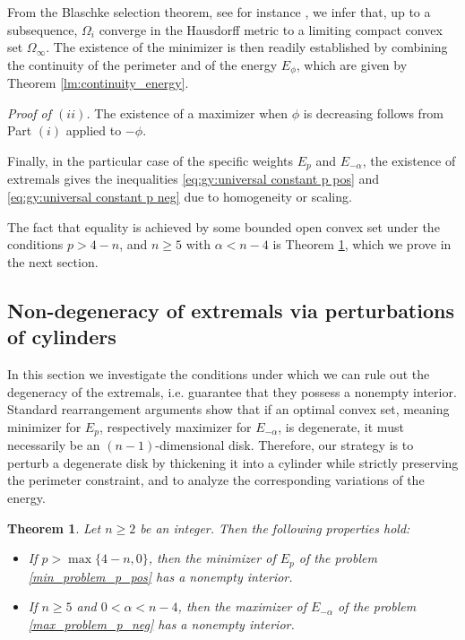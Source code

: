 \documentclass[10pt,leqno]{amsart}
\makeatletter
\newtheorem{Theorem}{Theorem}
\numberwithin{Theorem}{section}
\theoremstyle{definition}
\theoremstyle{remark}
\numberwithin{equation}{section}
\numberwithin{equation}{section}
\newenvironment{customproof}[1]{%
  \par\pushQED{\qed}%
  \normalfont\topsep6pt \trivlist
  \item[\hskip\labelsep\itshape
    Proof of #1\@addpunct{.}]\ignorespaces
}{%
  \popQED\endtrivlist\@endpefalse
}
\makeatother
\begin{document}
\begin{customproof}{Theorem \ref{Thm:intro:existence1}}
From the Blaschke selection theorem, see for instance \cite[Theorem 1.8.7]{Schneider}, we infer that, up to a subsequence, $\Omega_i$ converge in the Hausdorff metric to a limiting compact convex set $\Omega_\infty$. The existence of the minimizer is then readily established by combining the continuity of the perimeter and of the energy $E_\phi$, which are given by Theorem \ref{lm:continuity_energy}.

\smallskip
\textit{Proof of $(ii)$.} The existence of a maximizer when $\phi$ is decreasing follows  from Part $(i)$ applied to $-\phi$.


\smallskip
Finally, in the particular case of the specific weights $E_{p}$ and $E_{-\alpha}$, the existence of extremals gives the inequalities \eqref{eq:gy:universal constant p pos} and \eqref{eq:gy:universal constant p neg} due to homogeneity or scaling.

The fact that equality is achieved by some bounded open convex set under the  conditions $p> 4-n$, and $n \ge 5$ with $\alpha < n-4$ is Theorem \ref{thm:nonempty_interior}, which we prove in the next section. 
\end{customproof}


\subsection{Non-degeneracy of extremals via perturbations of cylinders}
\label{Sec:non_degeneracy}



In this section we investigate the conditions under which we can rule out the degeneracy of the extremals, i.e. guarantee that they possess a nonempty interior. Standard rearrangement arguments show that if an optimal convex set, meaning minimizer for $E_p$, respectively maximizer for $E_{-\alpha}$, is degenerate, it must necessarily  be an $(n-1)$-dimensional disk. Therefore, our strategy is to perturb a degenerate disk by thickening it into a cylinder while strictly preserving the perimeter constraint, and to analyze the corresponding variations of the energy.

\begin{Theorem} \label{thm:nonempty_interior}
Let $n\geq 2$ be an integer. Then the following properties hold:
   \begin{itemize}
       \item[(i)] If $p> \max\{4-n,0\}$, then the minimizer of $E_p$ of the problem \eqref{min_problem_p_pos} has a nonempty interior.
       \item[(ii)] If $n \ge 5$ and $0 < \alpha < n-4$, then the maximizer of $E_{-\alpha}$ of the problem \eqref{max_problem_p_neg} has a nonempty interior.
   \end{itemize} 
\end{Theorem}
\end{document}
